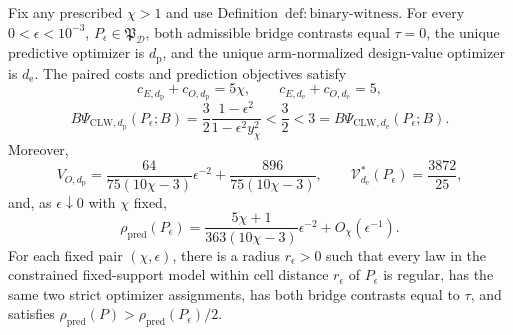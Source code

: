 Fix any prescribed \(\chi>1\) and use Definition~\(\mathrm{def{:}binary\text{-}witness}\). For every \(0<\epsilon<10^{-3}\), \(P_\epsilon\in\mathfrak P_{\mathcal D}\), both admissible bridge contrasts equal \(\tau=0\), the unique predictive optimizer is \(d_{\mathrm p}\), and the unique arm-normalized design-value optimizer is \(d_{\mathrm e}\). The paired costs and prediction objectives satisfy
\[
 c_{E,d_{\mathrm p}}+c_{O,d_{\mathrm p}}=5\chi,
 \qquad
 c_{E,d_{\mathrm e}}+c_{O,d_{\mathrm e}}=5,
\]
\[
 B\Psi_{\mathrm{CLW},d_{\mathrm p}}(P_\epsilon;B)
 =\frac32\frac{1-\epsilon^2}{1-\epsilon^2y_\chi^2}
 <\frac32<3
 =B\Psi_{\mathrm{CLW},d_{\mathrm e}}(P_\epsilon;B).
\]
Moreover,
\[
 V_{O,d_{\mathrm p}}
 =\frac{64}{75(10\chi-3)}\epsilon^{-2}
 +\frac{896}{75(10\chi-3)},
 \qquad
 \mathcal V_{d_{\mathrm e}}^*(P_\epsilon)=\frac{3872}{25},
\]
and, as \(\epsilon\downarrow0\) with \(\chi\) fixed,
\[
 \rho_{\mathrm{pred}}(P_\epsilon)
 =\frac{5\chi+1}{363(10\chi-3)}\epsilon^{-2}
 +O_\chi(\epsilon^{-1}).
\]
For each fixed pair \((\chi,\epsilon)\), there is a radius \(r_\epsilon>0\) such that every law in the constrained fixed-support model within cell distance \(r_\epsilon\) of \(P_\epsilon\) is regular, has the same two strict optimizer assignments, has both bridge contrasts equal to \(\tau\), and satisfies \(\rho_{\mathrm{pred}}(P)>\rho_{\mathrm{pred}}(P_\epsilon)/2\).